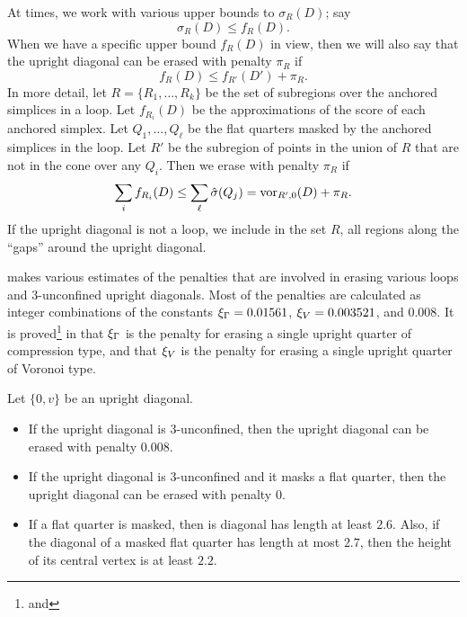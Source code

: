 \begin{remark}  At times, we work with various upper bounds to $\sigma_R(D)$;
say
    $$\sigma_R(D)\le f_R(D).$$
When we have a specific upper bound $f_R(D)$ in view, then we will
also say that the upright diagonal can be erased with penalty
$\pi_R$ if
    $$f_R(D) \le f_{R'}(D') +\pi_R.$$
In more detail, let $R=\{R_1,\ldots,R_k\}$ be the set of
subregions over the anchored simplices in a loop.  Let
$f_{R_i}(D)$ be the approximations of the score of each anchored
simplex. Let $Q_1,\ldots,Q_\ell$ be the flat quarters masked by
the anchored simplices in the loop. Let $R'$ be the subregion of
points in the union of $R$ that are not in the cone over any
$Q_i$.  Then we erase with penalty $\pi_R$ if
    $$\sum_i f_{R_i}(D) \le \sum_\ell \hat\sigma(Q_j) =
    \operatorname{vor}_{R',0}(D) + \pi_R.$$
If the upright diagonal is not a loop, we include in the set $R$,
all regions along the ``gaps'' around the upright diagonal.
\end{remark}



 makes various estimates
of the penalties that are involved in erasing various loops and
$3$-unconfined upright diagonals.  Most of the penalties are
calculated as integer combinations of the constants $\xi_\Gamma =
0.01561$, $\xi_V = 0.003521$, and $0.008$.  It is
proved\footnote{ and } in
 that $\xi_\Gamma$ is the
penalty for erasing a single upright quarter of compression type,
and that $\xi_V$ is the penalty for erasing a single upright
quarter of Voronoi type.

\begin{lemma} \label{lemma:2.7}
 Let $\{0,v\}$ be an upright diagonal.
    \begin{itemize}
    \item If the upright diagonal is $3$-unconfined,
    then the upright diagonal can be
    erased with penalty $0.008$.
    \item If the upright diagonal is $3$-unconfined and it masks a
    flat quarter, then the upright diagonal can be erased with
    penalty $0$.
    \item If a flat quarter is masked, then is diagonal has length
    at least $2.6$.  Also, if the diagonal of a masked flat
    quarter has length at most $2.7$, then the height of its
    central vertex is at least $2.2$.
    \end{itemize}
\end{lemma}

